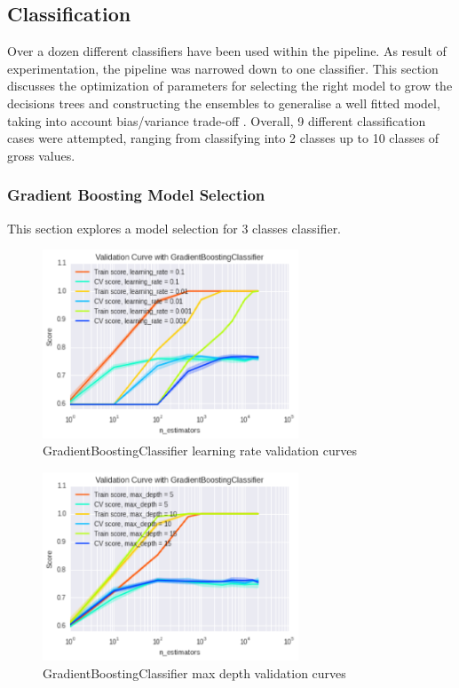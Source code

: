 \subsection{Classification}

Over a dozen different classifiers have been used within the pipeline. As result of experimentation, the pipeline was narrowed down to one classifier. This section discusses the optimization of parameters for selecting the right model to grow the decisions trees and constructing the ensembles to generalise a well fitted model, taking into account bias/variance trade-off \cite{biasvariance}. Overall, 9 different classification cases were attempted, ranging from classifying into 2 classes up to 10 classes of gross values. 

\subsubsection{Gradient Boosting Model Selection}
This section explores a model selection for 3 classes classifier.

\begin{figure}[h]
\centering
\includegraphics[width=3.0in]{figures/v_curve1}
\caption{GradientBoostingClassifier learning rate validation curves} 
\label{fig:gradient1}
\end{figure}

\begin{figure}[h]
\centering
\includegraphics[width=3.0in]{figures/v_curve2}
\caption{GradientBoostingClassifier max depth validation curves}
\label{fig:gradient2}
\end{figure}

